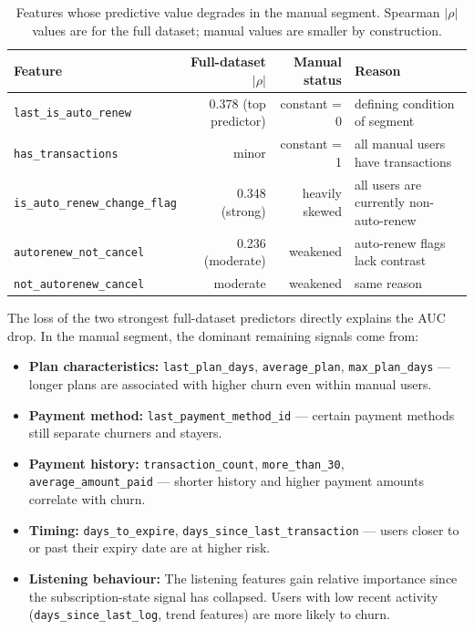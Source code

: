 \documentclass{article}
\begin{document}
\begin{table}[H]
\centering
\small
\renewcommand{\arraystretch}{1.2}
\begin{tabular}{lrrl}
\toprule
\textbf{Feature} & \textbf{Full-dataset $|\rho|$} & \textbf{Manual status} & \textbf{Reason} \\
\midrule
\texttt{last\_is\_auto\_renew}       & 0.378 (top predictor) & constant = 0  & defining condition of segment \\
\texttt{has\_transactions}           & minor               & constant = 1  & all manual users have transactions \\
\texttt{is\_auto\_renew\_change\_flag} & 0.348 (strong)     & heavily skewed & all users are currently non-auto-renew \\
\texttt{autorenew\_not\_cancel}       & 0.236 (moderate)   & weakened      & auto-renew flags lack contrast \\
\texttt{not\_autorenew\_cancel}       & moderate           & weakened      & same reason \\
\bottomrule
\end{tabular}
\caption{Features whose predictive value degrades in the manual segment. Spearman $|\rho|$ values are for the full dataset; manual values are smaller by construction.}
\label{tab:feat_degrade}
\end{table}

The loss of the two strongest full-dataset predictors directly explains the AUC drop. In the manual segment, the dominant remaining signals come from:

\begin{itemize}
    \item \textbf{Plan characteristics:} \texttt{last\_plan\_days}, \texttt{average\_plan}, \texttt{max\_plan\_days} --- longer plans are associated with higher churn even within manual users.
    \item \textbf{Payment method:} \texttt{last\_payment\_method\_id} --- certain payment methods still separate churners and stayers.
    \item \textbf{Payment history:} \texttt{transaction\_count}, \texttt{more\_than\_30}, \texttt{average\_amount\_paid} --- shorter history and higher payment amounts correlate with churn.
    \item \textbf{Timing:} \texttt{days\_to\_expire}, \texttt{days\_since\_last\_transaction} --- users closer to or past their expiry date are at higher risk.
    \item \textbf{Listening behaviour:} The listening features gain relative importance since the subscription-state signal has collapsed. Users with low recent activity (\texttt{days\_since\_last\_log}, trend features) are more likely to churn.
\end{itemize}
\end{document}
